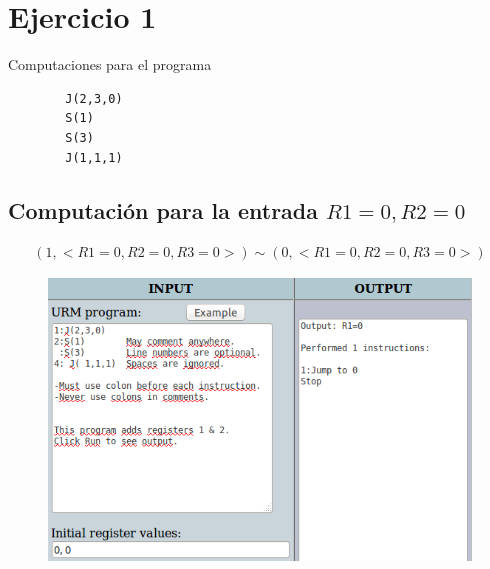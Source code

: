 \section{Ejercicio 1}
		Computaciones para el programa
		\begin{verbatim}
		J(2,3,0)
		S(1)
		S(3)
		J(1,1,1)
		\end{verbatim}
  		\subsection{Computación para la entrada $R1=0, R2=0$}
		\begin{equation*}\begin{gathered}
		(1, <R1=0, R2=0, R3=0>) \sim (0, <R1=0, R2=0, R3=0>)
		\end{gathered}\end{equation*}
		\begin{figure}[H]
  			\centering
  			\includegraphics[scale=0.5]{images/100.png}
  		\end{figure}
